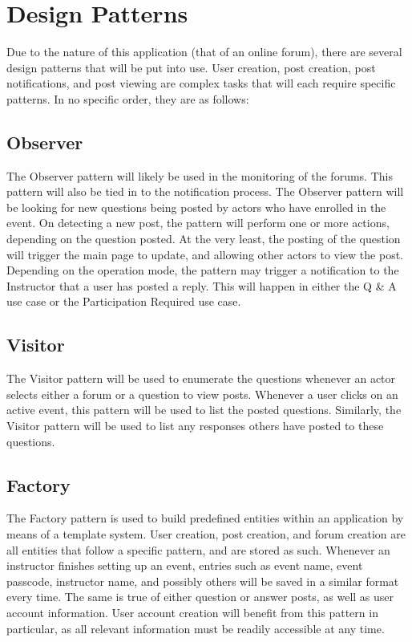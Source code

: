 \documentclass[12pt]{article}
\begin{document}
\section{Design Patterns}
Due to the nature of this application (that of an online forum), there are several design patterns that will be put into use. User creation, post creation, post notifications, and post viewing are complex tasks that will each require specific patterns. In no specific order, they are as follows:

\subsection{Observer}
\begin{flushleft}
The Observer pattern will likely be used in the monitoring of the forums. This pattern will also be tied in to the notification process. The Observer pattern will be looking for new questions being posted by actors who have enrolled in the event. On detecting a new post, the pattern will perform one or more actions, depending on the question posted. At the very least, the posting of the question will trigger the main page to update, and allowing other actors to view the post. Depending on the operation mode, the pattern may trigger a notification to the Instructor that a user has posted a reply. This will happen in either the Q \& A use case or the Participation Required use case.
\end{flushleft}
\subsection{Visitor}
\begin{flushleft}
The Visitor pattern will be used to enumerate the questions whenever an actor selects either a forum or a question to view posts. Whenever a user clicks on an active event, this pattern will be used to list the posted questions. Similarly, the Visitor pattern will be used to list any responses others have posted to these questions. 
\end{flushleft}
\subsection{Factory}
\begin{flushleft}
The Factory pattern is used to build predefined entities within an application by means of a template system. User creation, post creation, and forum creation are all entities that follow a specific pattern, and are stored as such. Whenever an instructor finishes setting up an event, entries such as event name, event passcode, instructor name, and possibly others will be saved in a similar format every time. The same is true of either question or answer posts, as well as user account information. User account creation will benefit from this pattern in particular, as all relevant information must be readily accessible at any time.
\end{flushleft}
\end{document}
